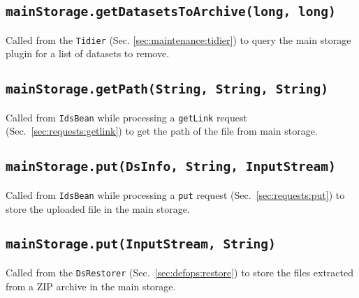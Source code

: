 \documentclass[paper=a4]{scrartcl}
\begin{document}
\subsection{\texttt{mainStorage.getDatasetsToArchive(long, long)}}

Called from the \texttt{Tidier} (Sec. \ref{sec:maintenance:tidier}) to
query the main storage plugin for a list of datasets to remove.

\subsection{\texttt{mainStorage.getPath(String, String, String)}}

Called from \texttt{IdsBean} while processing a \texttt{getLink}
request (Sec.\ \ref{sec:requests:getlink}) to get the path of the file
from main storage.

\subsection{\texttt{mainStorage.put(DsInfo, String, InputStream)}}

Called from \texttt{IdsBean} while processing a \texttt{put} request
(Sec.\ \ref{sec:requests:put}) to store the uploaded file in the main
storage.

\subsection{\texttt{mainStorage.put(InputStream, String)}}

Called from the \texttt{DsRestorer} (Sec.\ \ref{sec:defops:restore})
to store the files extracted from a ZIP archive in the main storage.
\end{document}
